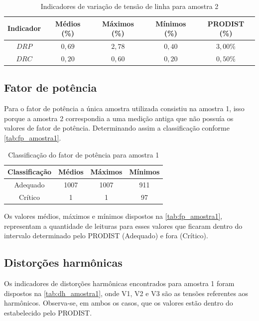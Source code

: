 \begin{table}[H]
  \centering
  \caption{Indicadores de variação de tensão de linha para amostra 2}
  \label{tab:vt_linha_a2}
  \begin{tabular}{@{}ccccc@{}}
    \toprule
    Indicador & Médios (\%) & Máximos (\%) & Mínimos (\%) & PRODIST (\%) \\
    \midrule
    $DRP$ & $0,69$ & $2,78$ & $0,40$ & $3,00\%$ \\
    $DRC$ & $0,20$ & $0,60$ & $0,20$ & $0,50\%$ \\
    \bottomrule
  \end{tabular}
\end{table}

\subsection{Fator de potência}

Para o fator de potência a única amostra utilizada consistiu na amostra 1, isso porque a amostra 2 correspondia a uma medição antiga que não possuía os valores de fator de potência. Determinando assim a classificação conforme \autoref{tab:fp_amostra1}.

\begin{table}[H]
  \centering
  \caption{Classificação do fator de potência para amostra 1}
  \label{tab:fp_amostra1}
  \begin{tabular}{@{}cccc@{}}
    \toprule
    Classificação & Médios & Máximos & Mínimos \\
    \midrule
    Adequado & 1007 & 1007 & 911 \\
    Crítico & 1 & 1 & 97 \\
    \bottomrule
  \end{tabular}
\end{table}

Os valores médios, máximos e mínimos dispostos na \autoref{tab:fp_amostra1}, representam a quantidade de leituras para esses valores que ficaram dentro do intervalo determinado pelo PRODIST (Adequado) e fora (Crítico).

\subsection{Distorções harmônicas}

Os indicadores de distorções harmônicas encontrados para amostra 1 foram dispostos na \autoref{tab:dh_amostra1}, onde V1, V2 e V3 são as tensões referentes aos harmônicos. Observa-se, em ambos os casos, que os valores estão dentro do estabelecido pelo PRODIST.

